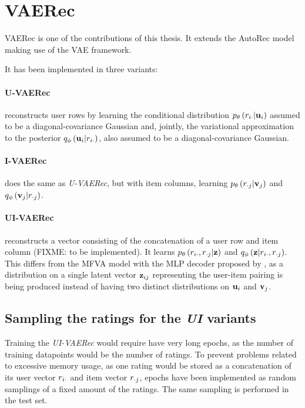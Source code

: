 \section{VAERec}

VAERec is one of the contributions of this thesis.
It extends the AutoRec model making use of the VAE framework.

It has been implemented in three variants:

\paragraph{U-VAERec} 
reconstructs user rows by learning the conditional distribution
$p_\theta\left(r_{i\cdot}|\mathbf{u}_i\right)$ assumed to be a diagonal-covariance Gaussian
and, jointly, the variational approximation to the posterior
$q_\phi\left(\mathbf{u}_i|r_{i\cdot}\right)$, also assumed to be a diagonal-covariance Gaussian.

\paragraph{I-VAERec} does the same as \emph{U-VAERec}, 
but with item columns, learning $p_\theta\left(r_{\cdot j}|\mathbf{v}_j\right)$
and $q_\phi\left(\mathbf{v}_j|r_{\cdot j}\right)$.

\paragraph{UI-VAERec} reconstructs a vector consisting of the concatenation
of a user row and item column (FIXME: to be implemented).
It learns $p_\theta\left(r_{i\cdot},r_{\cdot j}|\mathbf{z}\right)$
and $q_\phi\left(\mathbf{z}|r_{i\cdot},r_{\cdot j}\right)$.
This differs from the MFVA model with 
the MLP decoder proposed by
\cite{vanBaalen2016}, as a distribution on a 
single latent vector $\mathbf{z}_{ij}$ representing
the user-item pairing is being produced instead 
of having two distinct distributions on
$\mathbf{u}_i$ and $\mathbf{v}_j$.

\subsection{Sampling the ratings for the \emph{UI} variants}

Training the \emph{UI-VAERec} would require
have very long epochs, as the number of training
datapoints would be the number of ratings.
To prevent problems related to excessive memory usage,
as one rating would be stored as a concatenation of
its user vector $r_{i\cdot}$ and item vector $r_{\cdot j}$,
epochs have been implemented as random samplings 
of a fixed amount of the ratings.
The same sampling is performed in the test set.
